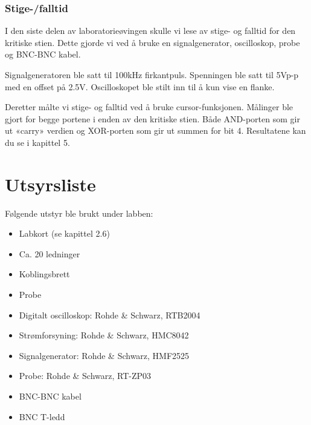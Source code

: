 \documentclass{article}
\begin{document}
\subsubsection{Stige-/falltid}
I den siste delen av laboratorieøvingen skulle vi lese av stige- og falltid for den kritiske stien. Dette gjorde vi ved å bruke en signalgenerator, oscilloskop, probe og BNC-BNC kabel.

Signalgeneratoren ble satt til 100kHz firkantpuls. Spenningen ble satt til 5Vp-p med en offset på 2.5V.  Oscilloskopet ble stilt inn til å kun vise en flanke.

Deretter målte vi stige- og falltid ved å bruke cursor-funksjonen. Målinger ble gjort for begge portene i enden av den kritiske stien. Både AND-porten som gir ut «carry» verdien og XOR-porten som gir ut summen for bit 4. Resultatene kan du se i kapittel 5.

\section{Utsyrsliste}
Følgende utstyr ble brukt under labben:
\begin{itemize}
	\item Labkort (se kapittel 2.6)
	\item Ca. 20 ledninger
	\item Koblingsbrett
	\item Probe
	\item Digitalt oscilloskop: Rohde \& Schwarz, RTB2004
	\item Strømforsyning: Rohde \& Schwarz, HMC8042
	\item Signalgenerator: Rohde \& Schwarz, HMF2525
	\item Probe: Rohde \& Schwarz, RT-ZP03
	\item BNC-BNC kabel
	\item BNC T-ledd
\end{itemize}
\end{document}
